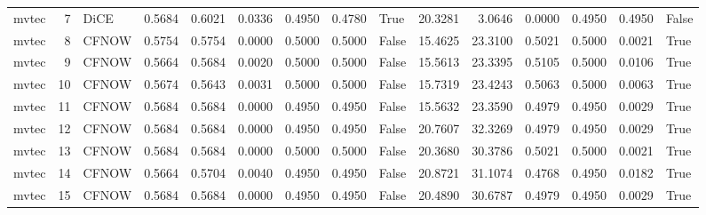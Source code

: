 \begin{tabular}{lrlrrrrrlrrrrrl}
   mvtec &      7 &   DiCE &      0.5684 &    0.6021 &       0.0336 &                 0.4950 &           0.4780 &            True &      20.3281 &                  3.0646 &                              0.0000 &         0.4950 &                0.4950 &                 False \\
   mvtec &      8 &  CFNOW &      0.5754 &    0.5754 &       0.0000 &                 0.5000 &           0.5000 &           False &      15.4625 &                 23.3100 &                              0.5021 &         0.5000 &                0.0021 &                  True \\
   mvtec &      9 &  CFNOW &      0.5664 &    0.5684 &       0.0020 &                 0.5000 &           0.5000 &           False &      15.5613 &                 23.3395 &                              0.5105 &         0.5000 &                0.0106 &                  True \\
   mvtec &     10 &  CFNOW &      0.5674 &    0.5643 &       0.0031 &                 0.5000 &           0.5000 &           False &      15.7319 &                 23.4243 &                              0.5063 &         0.5000 &                0.0063 &                  True \\
   mvtec &     11 &  CFNOW &      0.5684 &    0.5684 &       0.0000 &                 0.4950 &           0.4950 &           False &      15.5632 &                 23.3590 &                              0.4979 &         0.4950 &                0.0029 &                  True \\
   mvtec &     12 &  CFNOW &      0.5684 &    0.5684 &       0.0000 &                 0.4950 &           0.4950 &           False &      20.7607 &                 32.3269 &                              0.4979 &         0.4950 &                0.0029 &                  True \\
   mvtec &     13 &  CFNOW &      0.5684 &    0.5684 &       0.0000 &                 0.5000 &           0.5000 &           False &      20.3680 &                 30.3786 &                              0.5021 &         0.5000 &                0.0021 &                  True \\
   mvtec &     14 &  CFNOW &      0.5664 &    0.5704 &       0.0040 &                 0.4950 &           0.4950 &           False &      20.8721 &                 31.1074 &                              0.4768 &         0.4950 &                0.0182 &                  True \\
   mvtec &     15 &  CFNOW &      0.5684 &    0.5684 &       0.0000 &                 0.4950 &           0.4950 &           False &      20.4890 &                 30.6787 &                              0.4979 &         0.4950 &                0.0029 &                  True \\

\end{tabular}
